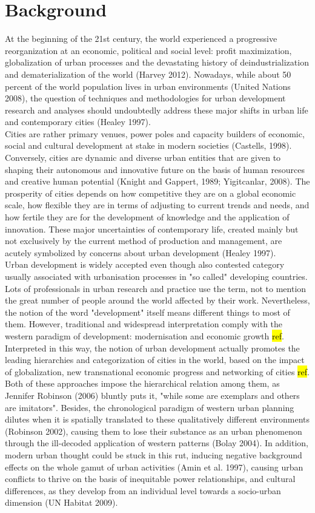 \documentclass[11pt]{report}
\begin{document}
\section{Background}

At the beginning of the 21st century, the world experienced a progressive reorganization at an economic, political and social level: profit maximization, globalization of urban processes and the devastating history of deindustrialization and dematerialization of the world (Harvey 2012). Nowadays, while about 50 percent of the world population lives in urban environments (United Nations 2008), the question of techniques and methodologies for urban development research and analyses should undoubtedly address these major shifts in urban life and contemporary cities (Healey 1997).
\\
Cities are rather primary venues, power poles and capacity builders of economic, social and cultural development at stake in modern societies (Castells, 1998). Conversely, cities are dynamic and diverse urban entities that are given to shaping their autonomous and innovative future on the basis of human resources and creative human potential (Knight and Gappert, 1989; Yigitcanlar, 2008). The prosperity of cities depends on how competitive they are on a global economic scale, how flexible they are in terms of adjusting to current trends and needs, and how fertile they are for the development of knowledge and the application of innovation. These major uncertainties of contemporary life, created mainly but not exclusively by the current method of production and management, are acutely symbolized by concerns about urban development (Healey 1997).
\\
Urban development is widely accepted even though also contested category usually associated with urbanisation processes in "so called" developing countries. Lots of professionals in urban research and practice use the term, not to mention the great number of people around the world affected by their work. Nevertheless, the notion of the word "development" itself means different things to most of them.
However, traditional and widespread interpretation comply with the western paradigm of development: modernisation and economic growth \hl{ref}. Interpreted in this way, the notion of urban development actually promotes the leading hierarchies and categorization of cities in the world, based on the impact of globalization, new transnational  economic  progress  and  networking  of  cities \hl{ref}. Both of these approaches impose the hierarchical relation among them, as Jennifer Robinson (2006) bluntly puts it, "while some are exemplars and others are imitators". Besides, the chronological paradigm of western urban planning dilutes when it is spatially translated to these qualitatively different environments (Robinson 2002), causing them to lose their substance as an urban phenomenon through the ill-decoded application of western patterns (Bolay 2004). In addition, modern urban thought could be stuck in this rut, inducing negative background effects on the whole gamut of urban activities (Amin et al. 1997), causing urban conflicts to thrive on the basis of inequitable power relationships, and cultural differences, as they develop from an individual level towards a socio-urban dimension (UN Habitat 2009).
\end{document}
